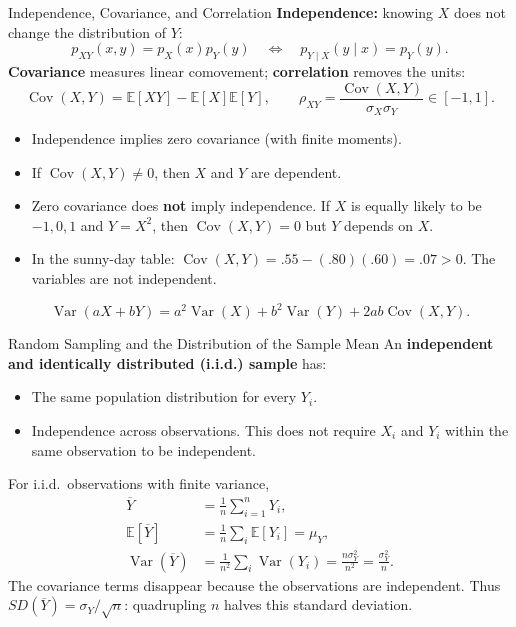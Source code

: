 \documentclass[10pt,aspectratio=169]{beamer}
\newcommand{\E}{\mathbb{E}}
\newcommand{\Var}{\operatorname{Var}}
\newcommand{\Cov}{\operatorname{Cov}}
\begin{document}
\begin{frame}{Independence, Covariance, and Correlation}
\small
\textbf{Independence:} knowing $X$ does not change the distribution of $Y$:
\[
p_{XY}(x,y)=p_X(x)p_Y(y)
\quad\Longleftrightarrow\quad
p_{Y\mid X}(y\mid x)=p_Y(y).
\]
\textbf{Covariance} measures linear comovement; \textbf{correlation} removes the units:
\[
\Cov(X,Y)=\E[XY]-\E[X]\E[Y],
\qquad
\rho_{XY}=\frac{\Cov(X,Y)}{\sigma_X\sigma_Y}\in[-1,1].
\]
\begin{itemize}
\item Independence implies zero covariance (with finite moments).
\item If $\Cov(X,Y)\ne 0$, then $X$ and $Y$ are dependent.
\item Zero covariance does \textbf{not} imply independence. If $X$ is equally likely to be $-1,0,1$ and $Y=X^2$, then $\Cov(X,Y)=0$ but $Y$ depends on $X$.
\item In the sunny-day table: $\Cov(X,Y)=.55-(.80)(.60)=.07>0$. The variables are not independent.
\end{itemize}
\[
\Var(aX+bY)=a^2\Var(X)+b^2\Var(Y)+2ab\Cov(X,Y).
\]
\end{frame}

\begin{frame}{Random Sampling and the Distribution of the Sample Mean}
An \textbf{independent and identically distributed (i.i.d.) sample} has:
\begin{itemize}
\item The same population distribution for every $Y_i$.
\item Independence across observations. This does not require $X_i$ and $Y_i$ within the same observation to be independent.
\end{itemize}
For i.i.d.\ observations with finite variance,
\begin{align*}
\overline Y&=\frac1n\sum_{i=1}^nY_i,\\
\E[\overline Y]&=\frac1n\sum_i\E[Y_i]=\mu_Y,\\
\Var(\overline Y)&=\frac1{n^2}\sum_i\Var(Y_i)
=\frac{n\sigma_Y^2}{n^2}=\frac{\sigma_Y^2}{n}.
\end{align*}
The covariance terms disappear because the observations are independent.
Thus $SD(\overline Y)=\sigma_Y/\sqrt n$: quadrupling $n$ halves this standard deviation.
\end{frame}
\end{document}
